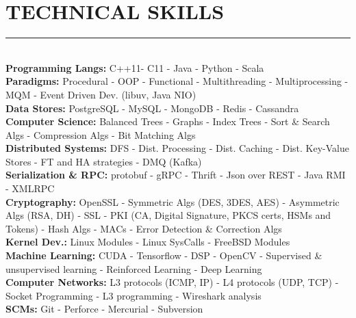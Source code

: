 \documentclass[10pt,a4paper]{article}
\begin{document}
\section{TECHNICAL SKILLS}
\noindent \rule {4.8cm}{0.4pt} \\
\noindent
\textbullet \hspace{0.1cm}\textbf{Programming Langs:} C++11- C11 - Java - Python - Scala \\
\textbullet \hspace{0.1cm}\textbf{Paradigms:} Procedural - OOP - Functional - Multithreading - Multiprocessing - MQM - Event Driven Dev. (libuv, Java NIO) \\
\textbullet \hspace{0.1cm}\textbf{Data Stores:} PostgreSQL - MySQL - MongoDB - Redis - Cassandra \\
\textbullet \hspace{0.1cm}\textbf{Computer Science:} Balanced Trees - Graphs - Index Trees - Sort \& Search Algs - Compression Algs - Bit Matching Algs  \\
\textbullet \hspace{0.1cm}\textbf{Distributed Systems:} DFS - Dist. Processing - Dist. Caching - Dist. Key-Value Stores - FT and HA strategies - DMQ (Kafka) \\
\textbullet \hspace{0.1cm}\textbf{Serialization \& RPC:} protobuf - gRPC - Thrift - Json over REST - Java RMI - XMLRPC \\
\textbullet \hspace{0.1cm}\textbf{Cryptography:} OpenSSL - Symmetric Algs (DES, 3DES, AES) - Asymmetric Algs (RSA, DH) - SSL - PKI (CA, Digital Signature, PKCS certs, HSMs and Tokens) - Hash Algs - MACs - Error Detection \& Correction Algs \\ 
\textbullet \hspace{0.1cm}\textbf{Kernel Dev.:} Linux Modules - Linux SysCalls - FreeBSD Modules \\
\textbullet \hspace{0.1cm}\textbf{Machine Learning:} CUDA - Tensorflow - DSP - OpenCV - Supervised \& unsupervised learning - Reinforced Learning - Deep Learning \\
\textbullet \hspace{0.1cm}\textbf{Computer Networks:} L3 protocols (ICMP, IP) - L4 protocols (UDP, TCP) - Socket Programming - L3 programming - Wireshark analysis \\
\textbullet \hspace{0.1cm}\textbf{SCMs:} Git - Perforce - Mercurial - Subversion \\
\end{document}
